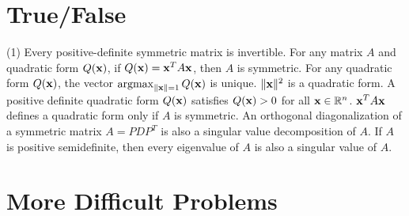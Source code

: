 \section{True/False}

\trueFalseHeader

\begin{tasks}[resume, style=enumerate](1)
\task
  Every positive-definite symmetric matrix is invertible.
\task
  For any matrix $A$ and quadratic form $Q(\mathbf x)$, if $Q(\mathbf x) =
  \mathbf x^TA\mathbf x$, then $A$ is symmetric.
\task
  For any quadratic form $Q(\mathbf x)$, the vector $\operatorname{\mathrm{argmax}}_{\|\mathbf x\| = 1}
  Q(\mathbf x)$ is unique.
\task
  $\|\mathbf x\|^2$ is a quadratic form.
\task
  A positive definite quadratic form $Q(\mathbf x)$ satisfies $Q(\mathbf x) > 0$
  for all $\mathbf x \in \mathbb R^n$.
\task
  $\mathbf x^T A \mathbf x$ defines a quadratic form only if $A$ is symmetric.
\task
  An orthogonal diagonalization of a symmetric matrix $A = PDP^T$ is
  also a singular value decomposition of $A$.
\task
  If $A$ is positive semidefinite, then every eigenvalue of $A$ is
  also a singular value of $A$.
\end{tasks}

\section{More Difficult Problems}


